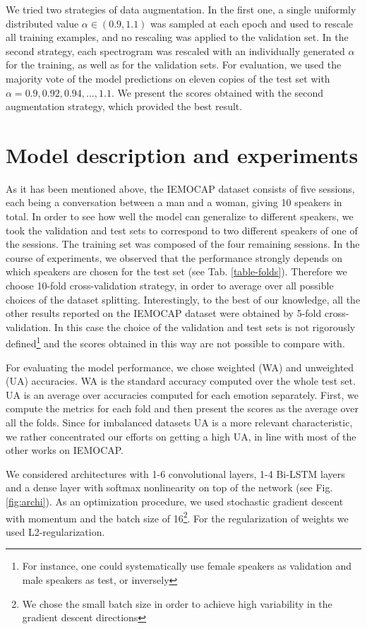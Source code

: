 \documentclass[a4paper]{article}
\begin{document}
We tried two strategies of data augmentation. In the first one, a single uniformly distributed value $\alpha\in (0.9, 1.1)$ was sampled at each epoch and used to 
rescale all training examples, and no rescaling was applied to the validation set. In the second strategy, each spectrogram was rescaled with an individually 
generated $\alpha$ for the training, as well as for the validation sets. For evaluation, we used the majority vote of the model predictions on eleven copies of 
the test set with $\alpha = 0.9, 0.92, 0.94,...,1.1$. We present the scores obtained with the second augmentation strategy, which provided the best result.


\section{Model description and experiments}
\label{modexp}
As it has been mentioned above, the IEMOCAP dataset consists of five sessions, each being a conversation between a man and a woman, giving 10 speakers in total. 
In order to see how well the model can generalize to different speakers, we took the validation and test sets to correspond to two different speakers of one of the sessions. 
The training set was composed of the four remaining sessions.
In the course of experiments, we observed that the performance strongly depends on which speakers are chosen for the test set (see Tab. \ref{table-folds}). 
Therefore we choose 10-fold cross-validation strategy, in order to average over all possible choices of the dataset splitting. Interestingly, to the best of our knowledge, 
all the other results reported on the IEMOCAP dataset were obtained by 5-fold cross-validation. In this case the choice of the validation and test sets is not 
rigorously defined\footnote{For instance, one could systematically use female speakers as validation and male speakers as test, or inversely} and the scores 
obtained in this way are not possible to compare with.

For evaluating the model performance, we chose weighted (WA) and unweighted (UA) accuracies. WA is the standard accuracy computed over the whole test set. UA is an average over 
accuracies computed for each emotion separately. First, we compute the metrics for each fold and then present the scores as the average over all the folds.
Since for imbalanced datasets UA is a more relevant characteristic, we rather concentrated our efforts on getting a high UA, in line with most of the other works on IEMOCAP.

We considered architectures with 1-6 convolutional layers, 1-4 Bi-LSTM layers and a dense layer with softmax nonlinearity on top of the network (see Fig. \ref{fig:archi}). 
As an optimization procedure, we used stochastic gradient descent with momentum and the batch size of 16\footnote{We chose the small batch size in order to achieve high variability in the gradient descent directions}. For the regularization of weights we used L2-regularization.
\end{document}
